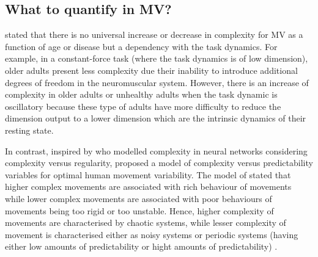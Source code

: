 \subsection{What to quantify in MV?} \label{what_to_measure_with_MV}
\cite{vaillancourt2002, vaillancourt2003} stated that there is no universal 
increase or decrease in complexity for MV as a function of age or disease 
but a dependency with the task dynamics. For example, in a constant-force 
task (where the task dynamics is of low dimension), older adults 
present less complexity due their inability to introduce additional degrees 
of freedom in the neuromuscular system. However, there is an increase of 
complexity in older adults or unhealthy adults when the task dynamic is 
oscillatory because these type of adults have more difficulty to reduce 
the dimension output to a lower dimension which are the intrinsic dynamics 
of their resting state.

In contrast, inspired by \cite{tononi1998} who modelled complexity 
in neural networks considering complexity versus regularity,
\cite{stergiou2006} proposed a model of complexity versus predictability 
variables for optimal human movement variability.
The model of \cite{stergiou2006} stated that higher complex movements are 
associated with rich behaviour of movements while lower complex movements 
are associated with poor behaviours of movements being too rigid or too 
unstable. Hence, higher complexity of movements are characterised by 
chaotic systems, while lesser complexity of movement is characterised either 
as noisy systems or periodic systems (having either low amounts of 
predictability or hight amounts of predictability) \citep{stergiou2006}.

